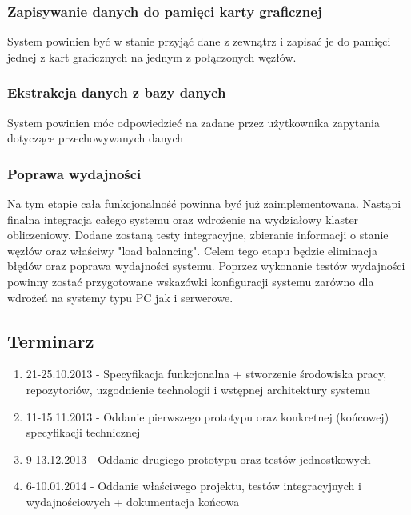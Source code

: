 \documentclass[paper=a4, fontsize=11pt]{scrartcl} %
\numberwithin{equation}{section} %
\numberwithin{figure}{section} %
\numberwithin{table}{section} %
\begin{document}
        \subsubsection{Zapisywanie danych do pamięci karty graficznej}
            System powinien być w stanie przyjąć dane z zewnątrz i zapisać je do pamięci jednej z kart graficznych na jednym z połączonych węzłów.
        \subsubsection{Ekstrakcja danych z bazy danych}
            System powinien móc odpowiedzieć na zadane przez użytkownika zapytania dotyczące przechowywanych danych
        \subsubsection{Poprawa wydajności}
            Na tym etapie cała funkcjonalność powinna być już zaimplementowana. Nastąpi finalna integracja całego systemu
            oraz wdrożenie na wydziałowy klaster obliczeniowy. Dodane zostaną testy integracyjne, zbieranie informacji o stanie węzłów oraz właściwy "load balancing". Celem tego etapu będzie eliminacja błędów oraz poprawa wydajności systemu. Poprzez wykonanie testów wydajności powinny zostać przygotowane wskazówki konfiguracji systemu zarówno dla wdrożeń na systemy typu PC jak i serwerowe.
    \subsection{Terminarz}
        \begin{enumerate}
            \item 21-25.10.2013 - Specyfikacja funkcjonalna + stworzenie środowiska pracy, repozytoriów, uzgodnienie technologii i wstępnej architektury systemu
            \item 11-15.11.2013 - Oddanie pierwszego prototypu oraz konkretnej (końcowej) specyfikacji technicznej
            \item 9-13.12.2013 - Oddanie drugiego prototypu oraz testów jednostkowych
            \item 6-10.01.2014 - Oddanie właściwego projektu, testów integracyjnych i wydajnościowych + dokumentacja końcowa
        \end{enumerate}
\end{document}
